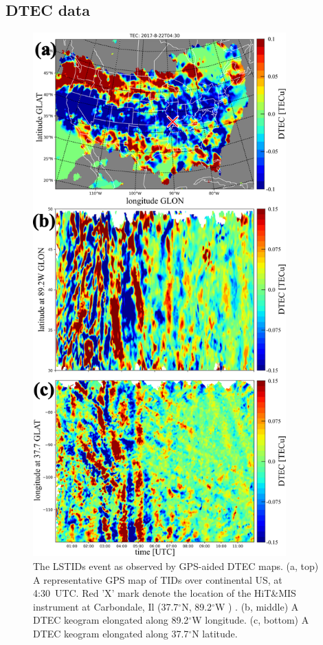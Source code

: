 \documentclass[crop=false,class=mitthesis,oneside,font=12pt]{standalone}
\begin{document}
\subsection{DTEC data}
\begin{figure}[htp]
\centering
\includegraphics[width=23pc]{tec_map.png}
\caption{The LSTIDs event as observed by GPS-aided DTEC maps. (a, top) A representative GPS map of TIDs over continental US, at 4:30~UTC. Red 'X' mark denote the location of the HiT\&MIS instrument at Carbondale, Il (37.7$^\circ$N, 89.2$^\circ$W ) . (b, middle) A DTEC keogram elongated along 89.2$^\circ$W longitude. (c, bottom) A DTEC keogram elongated along 37.7$^\circ$N latitude.}
\label{fig:tecmap}
\end{figure}
\end{document}
